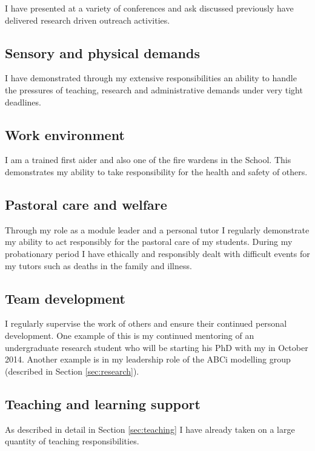 \documentclass{article}
\begin{document}
I have presented at a variety of conferences and ask discussed previously have delivered research driven outreach activities.

\subsection{Sensory and physical demands}

I have demonstrated through my extensive responsibilities an ability to handle the pressures of teaching, research and administrative demands under very tight deadlines.

\subsection{Work environment}

I am a trained first aider and also one of the fire wardens in the School.
This demonstrates my ability to take responsibility for the health and safety of others.

\subsection{Pastoral care and welfare}

Through my role as a module leader and a personal tutor I regularly demonstrate my ability to act responsibly for the pastoral care of my students.
During my probationary period I have ethically and responsibly dealt with difficult events for my tutors such as deaths in the family and illness.

\subsection{Team development}

I regularly supervise the work of others and ensure their continued personal development.
One example of this is my continued mentoring of an undergraduate research student who will be starting his PhD with my in October 2014.
Another example is in my leadership role of the ABCi modelling group (described in Section \ref{sec:research}).

\subsection{Teaching and learning support}

As described in detail in Section \ref{sec:teaching} I have already taken on a large quantity of teaching responsibilities.
\end{document}

